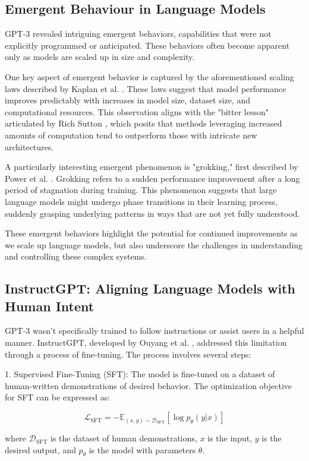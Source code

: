 \documentclass[a4paper, oneside]{discothesis}
\begin{document}
\subsection{Emergent Behaviour in Language Models}
GPT-3 revealed intriguing emergent behaviors, capabilities that were not explicitly programmed or anticipated. These behaviors often become apparent only as models are scaled up in size and complexity.

One key aspect of emergent behavior is captured by the aforementioned scaling laws described by Kaplan et al. \cite{kaplan2020scaling}. These laws suggest that model performance improves predictably with increases in model size, dataset size, and computational resources. This observation aligns with the "bitter lesson" articulated by Rich Sutton \cite{sutton2019bitter}, which posits that methods leveraging increased amounts of computation tend to outperform those with intricate new architectures.

A particularly interesting emergent phenomenon is "grokking," first described by Power et al. \cite{power2022grokking}. Grokking refers to a sudden performance improvement after a long period of stagnation during training. This phenomenon suggests that large language models might undergo phase transitions in their learning process, suddenly grasping underlying patterns in ways that are not yet fully understood.

These emergent behaviors highlight the potential for continued improvements as we scale up language models, but also underscore the challenges in understanding and controlling these complex systems.

\subsection{InstructGPT: Aligning Language Models with Human Intent}
GPT-3 wasn't specifically trained to follow instructions or assist users in a helpful manner. InstructGPT, developed by Ouyang et al. 
\cite{ouyang2022training}, addressed this limitation through a process of fine-tuning.
The process involves several steps:

1. Supervised Fine-Tuning (SFT): The model is fine-tuned on a dataset of human-written demonstrations of desired behavior. The optimization objective for SFT can be expressed as:

   \[\mathcal{L}_{\text{SFT}} = -\mathbb{E}_{(x,y)\sim \mathcal{D}_{\text{SFT}}}[\log p_\theta(y|x)]\]

   where $\mathcal{D}_{\text{SFT}}$ is the dataset of human demonstrations, $x$ is the input, $y$ is the desired output, and $p_\theta$ is the model with parameters $\theta$.
\end{document}
